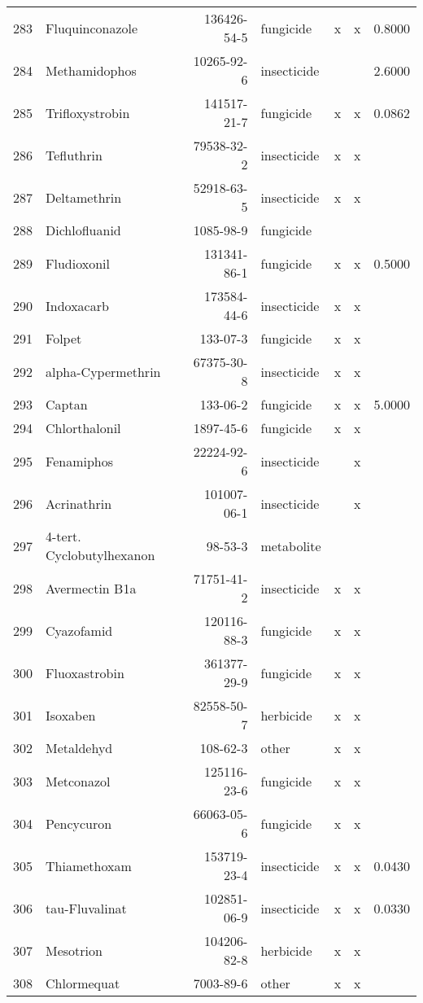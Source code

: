 \begin{longtable}{lp{3cm}rlp{0.5cm}p{0.5cm}p{1.5cm}}
  283 & Fluquinconazole & 136426-54-5 & fungicide & x & x & 0.8000 \\ 
  284 & Methamidophos & 10265-92-6 & insecticide &  &  & 2.6000 \\ 
  285 & Trifloxystrobin & 141517-21-7 & fungicide & x & x & 0.0862 \\ 
  286 & Tefluthrin & 79538-32-2 & insecticide & x & x &  \\ 
  287 & Deltamethrin & 52918-63-5 & insecticide & x & x &  \\ 
  288 & Dichlofluanid & 1085-98-9 & fungicide &  &  &  \\ 
  289 & Fludioxonil & 131341-86-1 & fungicide & x & x & 0.5000 \\ 
  290 & Indoxacarb & 173584-44-6 & insecticide & x & x &  \\ 
  291 & Folpet & 133-07-3 & fungicide & x & x &  \\ 
  292 & alpha-Cypermethrin & 67375-30-8 & insecticide & x & x &  \\ 
  293 & Captan & 133-06-2 & fungicide & x & x & 5.0000 \\ 
  294 & Chlorthalonil & 1897-45-6 & fungicide & x & x &  \\ 
  295 & Fenamiphos & 22224-92-6 & insecticide &  & x &  \\ 
  296 & Acrinathrin & 101007-06-1 & insecticide &  & x &  \\ 
  297 & 4-tert. Cyclobutylhexanon & 98-53-3 & metabolite &  &  &  \\ 
  298 & Avermectin B1a & 71751-41-2 & insecticide & x & x &  \\ 
  299 & Cyazofamid & 120116-88-3 & fungicide & x & x &  \\ 
  300 & Fluoxastrobin & 361377-29-9 & fungicide & x & x &  \\ 
  301 & Isoxaben & 82558-50-7 & herbicide & x & x &  \\ 
  302 & Metaldehyd & 108-62-3 & other & x & x &  \\ 
  303 & Metconazol & 125116-23-6 & fungicide & x & x &  \\ 
  304 & Pencycuron & 66063-05-6 & fungicide & x & x &  \\ 
  305 & Thiamethoxam & 153719-23-4 & insecticide & x & x & 0.0430 \\ 
  306 & tau-Fluvalinat & 102851-06-9 & insecticide & x & x & 0.0330 \\ 
  307 & Mesotrion & 104206-82-8 & herbicide & x & x &  \\ 
  308 & Chlormequat & 7003-89-6 & other & x & x &  \\ 

\end{longtable}
